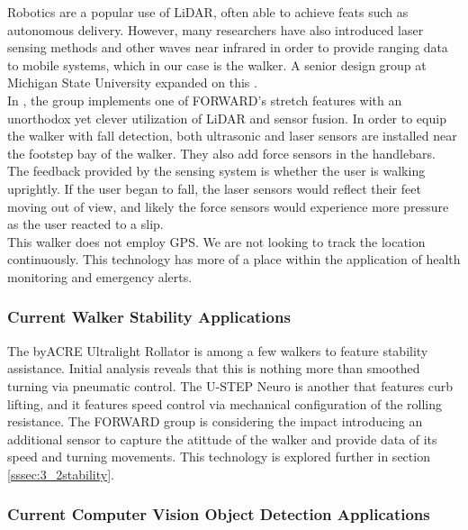 \noindent Robotics are a popular use of LiDAR, often able to achieve feats such as autonomous delivery. However, many researchers have also introduced laser sensing methods and other waves near infrared in order to provide ranging data to mobile systems, which in our case is the walker. A senior design group at Michigan State University expanded on this \cite{mstate}.\\

\noindent In \cite{FallDetect}, the group implements one of FORWARD's stretch features with an unorthodox yet clever utilization of LiDAR and sensor fusion. In order to equip the walker with fall detection, both ultrasonic and laser sensors are installed near the footstep bay of the walker. They also add force sensors in the handlebars. The feedback provided by the sensing system is whether the user is walking uprightly. If the user began to fall, the laser sensors would reflect their feet moving out of view, and likely the force sensors would experience more pressure as the user reacted to a slip.\\

\noindent This walker does not employ GPS. We are not looking to track the location continuously. This technology has more of a place within the application of health monitoring and emergency alerts.\\

\subsubsection{Current Walker Stability Applications}
\noindent The byACRE Ultralight Rollator \cite{byACRE} is among a few walkers to feature stability assistance. Initial analysis reveals that this is nothing more than smoothed turning via pneumatic control. The U-STEP Neuro \cite{ustep} is another that features curb lifting, and it features speed control via mechanical configuration of the rolling resistance. The FORWARD group is considering the impact introducing an additional sensor to capture the atittude of the walker and provide data of its speed and turning movements. This technology is explored further in section \ref{sssec:3_2stability}.\\

\subsubsection{Current Computer Vision Object Detection Applications}

